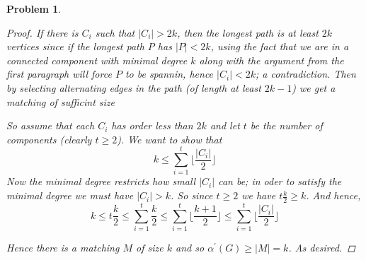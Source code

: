 \documentclass{article}
\newtheorem{prb}{Problem}
\begin{document}
\begin{prb}
\begin{proof}
	If there is $C_i$ such that $|C_i| > 2k$, then the longest path is at least $2k$ vertices since if the longest path $P$ has $|P| < 2k$, using the fact that we are in a connected component with minimal degree $k$ along with the argument from the first paragraph will force $P$ to be spannin, hence $|C_i| < 2k$; a contradiction. Then by selecting alternating edges in the path (of length at least $2k - 1$) we get a matching of sufficint size  

	So assume that each $C_i$ has order less than $2k$ and let $t$ be the number of components (clearly $t \geq 2$).  
	We want to show that 
	\[ k \leq \sum_{i = 1}^{t} \lfloor \frac{|C_i|}{2} \rfloor  \] 
	Now the minimal degree restricts how small $|C_i|$ can be; in oder to satisfy the minimal degree we must have $|C_i| > k$. 
	So since $t \geq 2$ we have $t \frac{k}{2} \geq k$. And hence, 
	\[ k\leq t\frac{k}{2} \leq \sum_{i=1}^t \frac{k}{2} \leq \sum_{i=1}^{t} \lfloor \frac{k+1}{2} \rfloor \leq \sum_{i = 1}^{t} \lfloor \frac{|C_i|}{2} \rfloor \] 

\noindent Hence there is a matching $M$ of size $k$ and so $\alpha^\prime(G) \geq |M| = k$. As desired. 
	\end{proof} 
\end{prb} 
\end{document}

